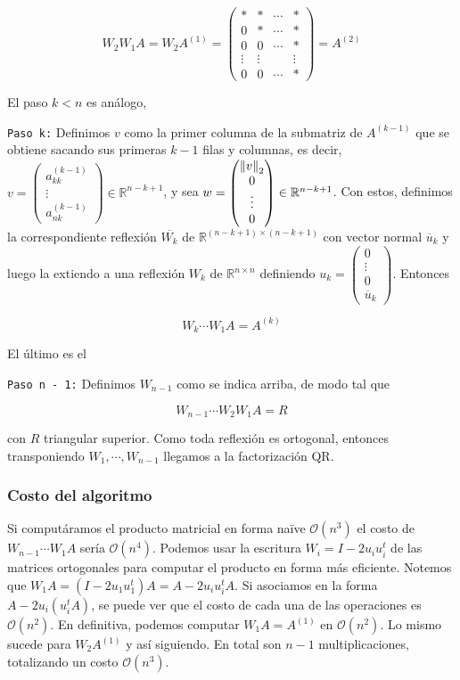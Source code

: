 \[W_2W_1A = W_2A^{(1)} = \begin{pmatrix}
* & * & \cdots & *\\
0 & * & \cdots & *\\
0 & 0 & \cdots & *\\
\vdots & \vdots & & \vdots \\
0 & 0 & \cdots & *
\end{pmatrix} = A^{(2)}\]

El paso $k < n$ es análogo,

\texttt{Paso k:} Definimos $v$ como la primer columna de la submatriz de $A^{(k - 1)}$ que se obtiene sacando sus primeras $k - 1$ filas y columnas, es decir, $v = \begin{pmatrix}a_{kk}^{(k - 1)}\\ \vdots \\ a_{nk}^{(k - 1)}\end{pmatrix} \in \mathbb{R}^{n - k + 1}$, y sea $w = \begin{pmatrix}\left\lVert v\right\rVert_2\\ 0 \\ \vdots \\ 0 \end{pmatrix} \in \mathbb{R}^{n - k + 1}$. Con estos, definimos la correspondiente reflexión $\overline{W_k}$ de $\mathbb{R}^{(n - k + 1) \times (n - k + 1)}$ con vector normal $\overline{u}_k$ y luego la extiendo a una reflexión $W_{k}$ de $\mathbb{R}^{n \times n}$ definiendo $u_k = \begin{pmatrix}0 \\ \vdots \\ 0 \\ \overline{u}_k\end{pmatrix}$. Entonces

\[W_k \cdots W_1 A = A^{(k)}\]

El último es el

\texttt{Paso n - 1:} Definimos $W_{n - 1}$ como se indica arriba, de modo tal que

\[W_{n - 1} \cdots W_2 W_1 A = R\]

con $R$ triangular superior. Como toda reflexión es ortogonal, entonces transponiendo $W_1, \cdots, W_{n - 1}$ llegamos a la factorización QR.

\subsubsection{Costo del algoritmo}

Si computáramos el producto matricial en forma naïve $\mathcal{O}(n^3)$ el costo de $W_{n - 1} \cdots W_1 A$ sería $\mathcal{O}(n^4)$. Podemos usar la escritura $W_i = I - 2 u_i u_i^t$ de las matrices ortogonales para computar el producto en forma más eficiente. Notemos que $W_1A = (I - 2u_1u_1^t)A = A - 2u_iu_i^tA$. Si asociamos en la forma $A - 2u_i(u_i^tA)$, se puede ver que el costo de cada una de las operaciones es $\mathcal{O}(n^2)$. En definitiva, podemos computar $W_1A = A^{(1)}$ en $\mathcal{O}(n^2)$. Lo mismo sucede para $W_2A^{(1)}$ y así siguiendo. En total son $n - 1$ multiplicaciones, totalizando un costo $\mathcal{O}(n^3)$.

